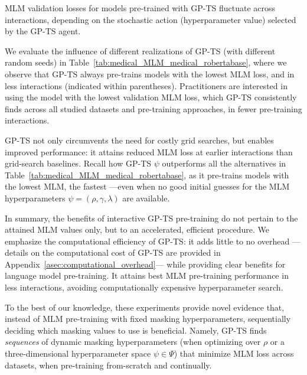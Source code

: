 MLM validation losses for models pre-trained with GP-TS fluctuate across interactions,
depending on the stochastic action (hyperparameter value) selected by the GP-TS agent.

We evaluate the influence of different realizations of GP-TS (with different random seeds) in Table~\ref{tab:medical_MLM_medical_robertabase},
where we observe that GP-TS always pre-trains models with the lowest MLM loss, and in less interactions (indicated within parentheses).
Practitioners are interested in using the model with the lowest validation MLM loss,
which GP-TS consistently finds across all studied datasets and pre-training approaches,
in fewer pre-training interactions.



%
GP-TS not only circumvents the need for costly grid searches, but enables improved performance:
it attains reduced MLM loss at earlier interactions than grid-search baselines.
Recall how GP-TS $\psi$ outperforms all the alternatives in Table~\ref{tab:medical_MLM_medical_robertabase},
as it pre-trains models with the lowest MLM, the fastest
---even when no good initial guesses for the MLM hyperparameters $\psi=\left(\rho, \gamma, \lambda\right)$ are available.

In summary, the benefits of interactive GP-TS pre-training do not pertain to the attained MLM values only,
but to an accelerated, efficient procedure.
We emphasize the computational efficiency of GP-TS:
it adds little to no overhead ---details on the computational cost of GP-TS are provided in Appendix~\ref{asec:computational_overhead}---
while providing clear benefits for language model pre-training.
It attains best MLM pre-training performance in less interactions,
avoiding computationally expensive hyperparameter search.

To the best of our knowledge, these experiments provide novel evidence that,
instead of MLM pre-training with fixed masking hyperparameters,
sequentially deciding which masking values to use is beneficial.
Namely, GP-TS finds \textit{sequences} of dynamic masking hyperparameters
(when optimizing over $\rho$ or a three-dimensional hyperparameter space $\psi\in\Psi$)
that minimize MLM loss across datasets, when pre-training from-scratch and continually.


